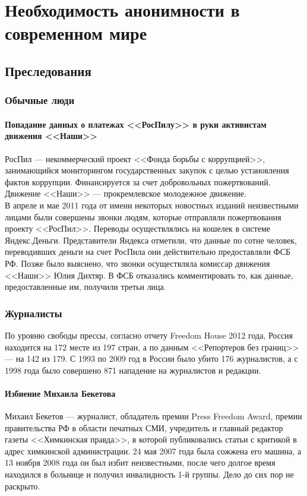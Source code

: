 \chapter{Необходимость анонимности в современном мире}
\section{Преследования}
\subsection{Обычные люди}
\subsubsection{Попадание данных о платежах <<РосПилу>> в руки активистам движения <<Наши>>}
РосПил --- некоммерческий проект <<Фонда борьбы с коррупцией>>, занимающийся мониторингом государственных закупок с целью установления фактов коррупции. Финансируется за счет добровольных пожертвований.\\
Движение <<Наши>> --- прокремлевское молодежное движение.\\
В апреле и мае 2011 года от имени некоторых новостных изданий неизвестными лицами были совершены звонки людям, которые отправляли пожертвования проекту <<РосПил>>\cite{rospil_call}. Переводы осуществлялись на кошелек в системе Яндекс.Деньги. Представители Яндекса отметили, что данные по сотне человек, переводивших деньги на счет РосПила они действительно предоставляли ФСБ РФ\cite{rospil_fsb}. Позже было выяснено, что звонки осуществляла комиссар движения <<Наши>> Юлия Дихтяр\cite{rospil_nashi}. В ФСБ отказались комментировать то, как данные, предоставленные им, получили третьи лица\cite{rospil_nashi}.
\subsection{Журналисты}
По уровню свободы прессы, согласно отчету Freedom House 2012 года, Россия находится на 172 месте из 197 стран\cite{pressfreedom}, а по данным <<Репортеров без границ>> --- на 142 из 179\cite{rsf}. С 1993 по 2009 год в России было убито 176 журналистов\cite{kill}, а с 1998 года было совершено 871 нападение на журналистов и редакции\cite{attack}.
\subsubsection{Избиение Михаила Бекетова}
Михаил Бекетов --- журналист, обладатель премии Press Freedom Award\cite{beketov_award}, премии правительства РФ в области печатных СМИ\cite{beketov_gosaward}, учредитель и главный редактор газеты <<Химкинская правда>>, в которой публиковались статьи с критикой в адрес химкинской администрации. 24 мая 2007 года была сожжена его машина\cite{beketov_car}, а 13 ноября 2008 года он был избит неизвестными\cite{beketov_beat}, после чего долгое время находился в больнице и получил инвалидность 1-й группы\cite{beketov_invalid}. Дело до сих пор не раскрыто.

